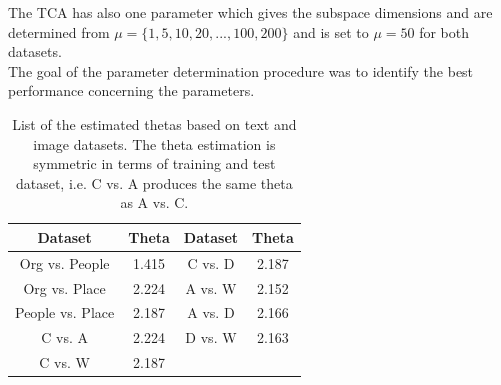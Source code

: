 The \acs{TCA} has also one parameter which gives the subspace dimensions and are determined from $\mu=\{1,5,10,20,...,100,200\}$ and is set to $\mu=50$ for both datasets.\\
The goal of the parameter determination procedure was to identify the best performance concerning the parameters.
\begin{table}[]
	\centering
		\begin{tabular}{|c|c||c|c|}
			\hline
			Dataset         & Theta & Dataset & Theta \\ \hline
			Org vs. People   & 1.415 & C vs. D  & 2.187 \\ \hline
			Org vs. Place    & 2.224 & A vs. W  & 2.152\\ \hline
			People vs. Place & 2.187 & A vs. D  & 2.166\\ \hline
			C vs. A          & 2.224 & D vs. W  & 2.163 \\ \hline
			C vs. W          & 2.187\\ \cline{1-2}
	\end{tabular}
	\caption[List of Estimated Thetas]{List of the estimated thetas based on text and image datasets. The theta estimation is symmetric in terms of training and test dataset, i.e. C vs. A produces the same theta as A vs. C.\label{TableThetaEst}}
\end{table}

